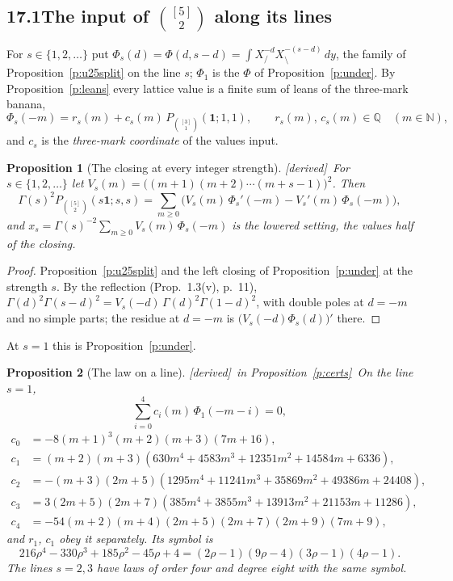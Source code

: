 \documentclass[11pt]{article}
\newcommand{\one}{\mathbf 1}
\newcommand{\Pth}{P_{\binom{[3]}1}(\one;1,1)}
\theoremstyle{plain}
\newtheorem{proposition}{Proposition}[section]
\theoremstyle{definition}
\theoremstyle{remark}
\newcommand{\derived}{\textup{[derived]}}
\begin{document}
\subsection*{17.1\quad The input of $\binom{[5]}2$ along its lines}

For $s\in\{1,2,\dots\}$ put $\Phi_s(d)=\Phi(d,s-d)=\int X_{/}^{-d}X_{\setminus}^{-(s-d)}\,dy$, the family of Proposition~\ref{p:u25split} on the line $s$; $\Phi_1$ is the $\Phi$ of Proposition~\ref{p:under}. By Proposition~\ref{p:leans} every lattice value is a finite sum of leans of the three-mark banana,
\[
\Phi_s(-m)=r_s(m)+c_s(m)\,\Pth,\qquad r_s(m),\,c_s(m)\in\mathbb Q\quad(m\in\mathbb N),
\]
and $c_s$ is the \emph{three-mark coordinate} of the values input.

\begin{proposition}[The closing at every integer strength]\label{p:u25clos}\derived\
For $s\in\{1,2,\dots\}$ let $V_s(m)=\big((m+1)(m+2)\cdots(m+s-1)\big)^2$. Then
\[
\Gamma(s)^2P_{\binom{[5]}2}(s\one;s,s)=\sum_{m\ge0}\Big(V_s(m)\,\Phi_s'(-m)-V_s'(m)\,\Phi_s(-m)\Big),
\]
and $x_s=\Gamma(s)^{-2}\sum_{m\ge0}V_s(m)\,\Phi_s(-m)$ is the lowered setting, the values half of the closing.
\end{proposition}

\begin{proof}
Proposition~\ref{p:u25split} and the left closing of Proposition~\ref{p:under} at the strength $s$. By the reflection (Prop.~1.3(v), p.~11), $\Gamma(d)^2\Gamma(s-d)^2=V_s(-d)\,\Gamma(d)^2\Gamma(1-d)^2$, with double poles at $d=-m$ and no simple parts; the residue at $d=-m$ is $\big(V_s(-d)\Phi_s(d)\big)'$ there.
\end{proof}

At $s=1$ this is Proposition~\ref{p:under}.

\begin{proposition}[The law on a line]\label{p:u25law}\derived\ in Proposition~\ref{p:certs}\
On the line $s=1$,
\[
\sum_{i=0}^4c_i(m)\,\Phi_1(-m-i)=0,
\]
\begin{align*}
c_0&=-8(m+1)^3(m+2)(m+3)(7m+16),\\
c_1&=(m+2)(m+3)(630m^4+4583m^3+12351m^2+14584m+6336),\\
c_2&=-(m+3)(2m+5)(1295m^4+11241m^3+35869m^2+49386m+24408),\\
c_3&=3(2m+5)(2m+7)(385m^4+3855m^3+13913m^2+21153m+11286),\\
c_4&=-54(m+2)(m+4)(2m+5)(2m+7)(2m+9)(7m+9),
\end{align*}
and $r_1$, $c_1$ obey it separately. Its symbol is
\[
216\rho^4-330\rho^3+185\rho^2-45\rho+4=(2\rho-1)(9\rho-4)(3\rho-1)(4\rho-1).
\]
The lines $s=2,3$ have laws of order four and degree eight with the same symbol.
\end{proposition}
\end{document}
